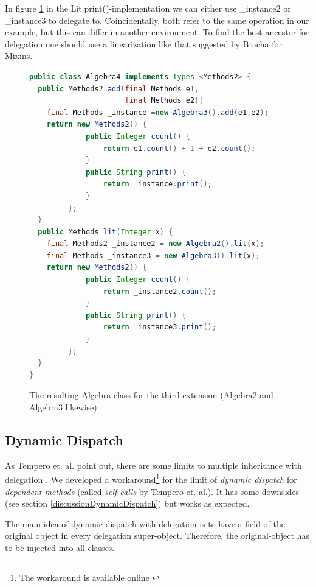 \documentclass{report}
\begin{document}
In figure \ref{algebraImplementation} in the Lit.print()-implementation we can either use \_instance2 or \_instance3 to delegate to. Coincidentally, both refer to the same operation in our example, but this can differ in another environment. To find the best ancestor for delegation one should use a linearization like that suggested by Bracha \cite{Bracha-Mixin-1990} for Mixins.

\begin{figure}[H]
\begin{lstlisting}[language=java]
public class Algebra4 implements Types <Methods2> {
  public Methods2 add(final Methods e1,
                      final Methods e2){
    final Methods _instance =new Algebra3().add(e1,e2);
    return new Methods2() {
             public Integer count() {
                 return e1.count() + 1 + e2.count();
             }
             public String print() {
                 return _instance.print();
             }
         };
  }
  public Methods lit(Integer x) { 
    final Methods2 _instance2 = new Algebra2().lit(x);
    final Methods _instance3 = new Algebra3().lit(x);
    return new Methods2() {
             public Integer count() { 
                 return _instance2.count();
             }
             public String print() { 
                 return _instance3.print();
             }
         };
  }
}
\end{lstlisting}
\caption{The resulting Algebra-class for the third extension (Algebra2 and Algebra3 likewise)}
\label{algebraImplementation}
\end{figure}

\subsection{Dynamic Dispatch}
\label{dynamicDispatch}

As Tempero et. al. point out, there are some limits to multiple inheritance with delegation \cite{Tempero-Multiple-2000}. We developed a workaround\footnote{The workaround is available online \cite{Peuscher-GitHub-EP-2014}} for the limit of \emph{dynamic dispatch} for \emph{dependent methods} (called \emph{self-calls} by Tempero et. al.). It has some downsides (see section \ref{discussionDynamicDispatch}) but works as expected.

The main idea of dynamic dispatch with delegation is to have a field of the original object in every delegation super-object. Therefore, the original-object has to be injected into all classes.
\end{document}
